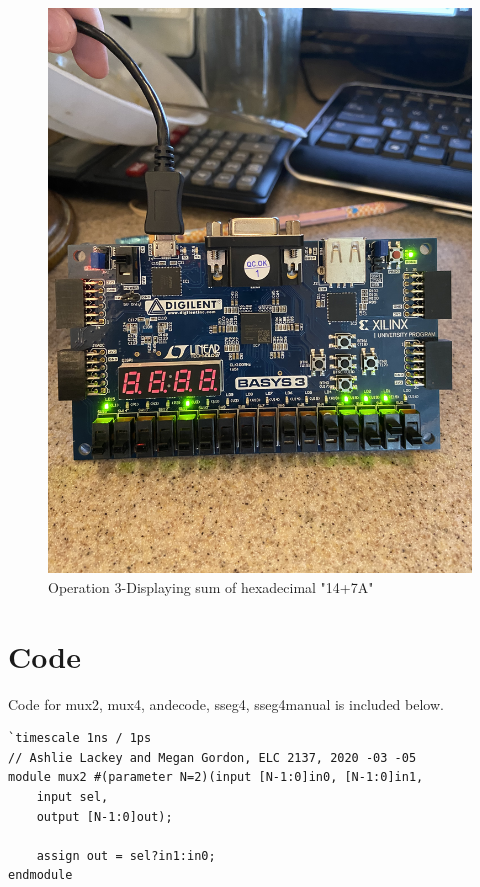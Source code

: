 \documentclass[11pt]{article}
\begin{document}
\begin{figure}[ht]\centering
	\includegraphics[angle=270, width=1.1\textwidth]{step3.jpg}
	\caption{Operation 3-Displaying sum of hexadecimal "14+7A"}
	\label{fig:sim_with_table}
\end{figure}
\clearpage





\section*{Code}

Code for mux2, mux4, andecode, sseg4, sseg4manual is included below.

\begin{lstlisting}[style=Verilog,caption=Mux2 Module Code,label=code:ex ]
`timescale 1ns / 1ps
// Ashlie Lackey and Megan Gordon, ELC 2137, 2020 -03 -05
module mux2 #(parameter N=2)(input [N-1:0]in0, [N-1:0]in1, 
	input sel,
	output [N-1:0]out);
	
	assign out = sel?in1:in0;
endmodule
\end{lstlisting}
\end{document}
